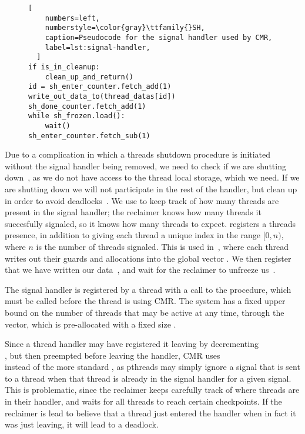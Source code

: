 \begin{figure}[b]
  \begin{lstlisting}[
    numbers=left,
    numberstyle=\color{gray}\ttfamily{}SH,
    caption=Pseudocode for the signal handler used by CMR,
    label=lst:signal-handler,
  ]
if is_in_cleanup:
    clean_up_and_return()
id = sh_enter_counter.fetch_add(1)
write_out_data_to(thread_datas[id])
sh_done_counter.fetch_add(1)
while sh_frozen.load():
    wait()
sh_enter_counter.fetch_sub(1)\end{lstlisting}
\end{figure}

Due to a complication in which a threads shutdown procedure is initiated without the signal handler
being removed, we need to check if we are shutting down~, as we do not have access to
the thread local storage, which we need. If we are shutting down we will not participate in the
rest of the handler, but clean up in order to avoid deadlocks~.
We use  to keep track of how many threads are present in the signal handler;
the reclaimer knows how many threads it succesfully signaled, so it knows how many threads to
expect.  registers a threads presence, in addition to giving each thread a unique
index in the range $[0, n)$, where $n$ is the number of threads signaled. This is used
in~, where each thread writes out their guards and allocations into the global vector
. We then register that we have written our data~, and wait for the
reclaimer to unfreeze us~.



The signal handler is registered by a thread with a call to the  procedure,
which must be called before the thread is using CMR\@. 
The system has a fixed upper bound on the number of threads that may be active at any time, through
the  vector, which is pre-allocated with a fixed size .

Since a thread handler may have registered it leaving by decrementing \\,
but then preempted before leaving the handler, CMR uses \\ instead of the more
standard , as \gls{pthreads} may simply ignore a signal that is sent to a
thread when that thread is already in the signal handler for a given signal.
This is problematic, since the reclaimer keeps carefully track of where threads are in their
handler, and waits for all threads to reach certain checkpoints. If the reclaimer is lead to
believe that a thread just entered the handler when in fact it was just leaving, it will lead to a
deadlock.


